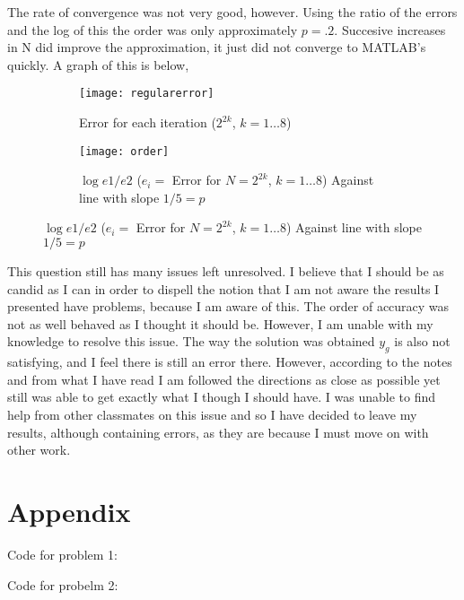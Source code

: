 \documentclass[]{article}
\begin{document}
\begin{flushleft}
The rate of convergence was not very good, however. Using the ratio of the errors and the log of this the order was only approximately $ p = .2 $. Succesive increases in N did improve the approximation, it just did not converge to MATLAB's quickly. A graph of this is below, 

\begin{figure}[H]
	\centering
	\begin{subfigure}[b]{0.3\textwidth}
		\texttt{[image: regularerror]}
		\caption{Error for each iteration ($ 2^{2k} $, $ k = 1\dots8 $)}
	\end{subfigure}
		\begin{subfigure}[b]{0.3\textwidth}
			\texttt{[image: order]}
			\caption{$ \log{e1/e2} $ ($ e_i =  $ Error for $ N = $$ 2^{2k} $, $ k = 1\dots8 $) Against line with slope $ 1/5 = p $}
		\end{subfigure}
\end{figure}

This question still has many issues left unresolved. I believe that I should be as candid as I can in order to dispell the notion that I am not aware the results I presented have problems, because I am aware of this. The order of accuracy was not as well behaved as I thought it should be.  However, I am unable with my knowledge to resolve this issue. The way the solution was obtained $ y_g $ is also not satisfying, and I feel there is still an error there. However, according to the notes and from what I have read I am followed the directions as close as possible yet still was able to get exactly what I though I should have. I was unable to find help from other classmates on this issue and so I have decided to leave my results, although containing errors, as they are because I must move on with other work. 
\section*{Appendix}
Code for problem 1:


Code for probelm 2:



	
\end{flushleft}	
	
	
	
	
	
	
	
\end{document}

